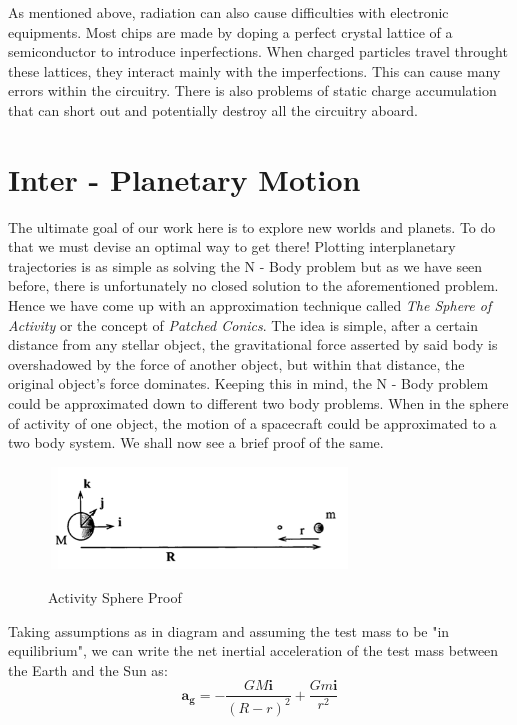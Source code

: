 \documentclass[12pt, letterpaper]{article}
\begin{document}
As mentioned above, radiation can also cause difficulties with electronic equipments. Most chips are made by doping a perfect crystal lattice of a semiconductor to introduce inperfections. When charged particles travel throught these lattices, they interact mainly with the imperfections. This can cause many errors within the circuitry. There is also problems of static charge accumulation that can short out and potentially destroy all the circuitry aboard.

\newpage
\section{Inter - Planetary Motion}

The ultimate goal of our work here is to explore new worlds and planets. To do that we must devise an optimal way to get there! Plotting interplanetary trajectories is as simple as solving the N - Body problem but as we have seen before, there is unfortunately no closed solution to the aforementioned problem. Hence we have come up with an approximation technique called \textit{The Sphere of Activity} or the concept of \textit{Patched Conics}. The idea is simple, after a certain distance from any stellar object, the gravitational force asserted by said body is overshadowed by the force of another object, but within that distance, the original object's force dominates. Keeping this in mind, the N - Body problem could be approximated down to different two body problems. When in the sphere of activity of one object, the motion of a spacecraft could be approximated to a two body system. We shall now see a brief proof of the same.

\begin{figure}[ht]
	\centering
    \includegraphics[width = 300px]{ASphere}
    \label{fig:ASphere}
    \caption{Activity Sphere Proof}
\end{figure}

Taking assumptions as in diagram and assuming the test mass to be "in equilibrium", we can write the net inertial acceleration of the test mass between the Earth and the Sun as:
\[
	\mathbf{a_g} = -\frac{GM\mathbf{i}}{(R-r)^2} + \frac{Gm\mathbf{i}}{r^2}
\]
\end{document}
